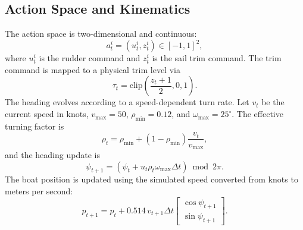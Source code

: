\documentclass{article}
\begin{document}
\subsection{Action Space and Kinematics}
The action space is two-dimensional and continuous:
\begin{equation}
    a_t^i=(u_t^i,z_t^i)\in[-1,1]^2,
\end{equation}
where $u_t^i$ is the rudder command and $z_t^i$ is the sail trim command. The trim command is mapped to a physical trim level via
\begin{equation}
    \tau_t = \mathrm{clip}\left(\frac{z_t+1}{2},0,1\right).
\end{equation}
The heading evolves according to a speed-dependent turn rate. Let $v_t$ be the current speed in knots, $v_{\max}=50$, $\rho_{\min}=0.12$, and $\omega_{\max}=25^\circ$. The effective turning factor is
\begin{equation}
    \rho_t = \rho_{\min}+(1-\rho_{\min})\frac{v_t}{v_{\max}},
\end{equation}
and the heading update is
\begin{equation}
    \psi_{t+1} =
    \left(\psi_t + u_t \rho_t \omega_{\max}\Delta t\right)\bmod 2\pi.
\end{equation}
The boat position is updated using the simulated speed converted from knots to meters per second:
\begin{equation}
    p_{t+1} =
    p_t +
    0.514\,v_{t+1}\Delta t
    \begin{bmatrix}
        \cos \psi_{t+1}\\
        \sin \psi_{t+1}
    \end{bmatrix}.
\end{equation}
\end{document}
